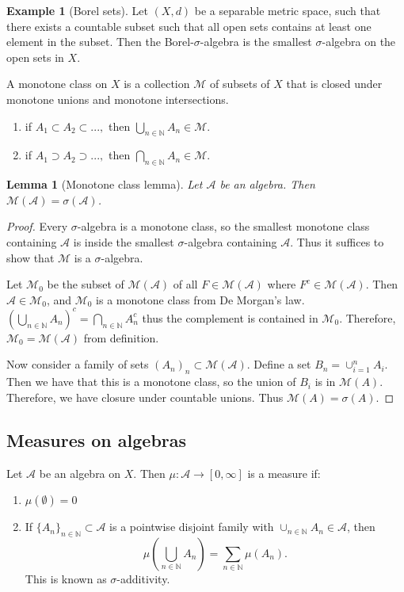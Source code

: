 \documentclass{article}
\newtheorem{lemma}[theorem]{Lemma}
\theoremstyle{definition}
\newtheorem{example}[theorem]{Example}
\numberwithin{theorem}{section}
\numberwithin{equation}{section}
\newcommand{\alg}{\mathcal{A}}
\newcommand{\mono}{\mathcal{M}}
\begin{document}
\begin{example}[Borel sets]
	Let $(X, d)$ be a separable metric space, such that there exists a countable subset such that all open sets contains at least one element in the subset. Then the Borel-$\sigma$-algebra is the smallest $\sigma$-algebra on the open sets in $X$.
\end{example}

A monotone class on $X$ is a collection $\mathcal{M}$ of subsets of $X$ that is closed under monotone unions and monotone intersections.
\begin{enumerate}
	\item if $A_1 \subset A_2 \subset ..., $ then $\bigcup_{n \in \mathbb{N}} A_n \in \mathcal{M}$.
	\item if $A_1 \supset A_2 \supset ..., $ then $\bigcap_{n \in \mathbb{N}} A_n \in \mathcal{M}$.
\end{enumerate}
\begin{lemma}[Monotone class lemma]
	Let $\alg$ be an algebra. Then $\mathcal{M}(\alg) = \sigma(\alg)$.
\end{lemma}

\begin{proof}
	Every $\sigma$-algebra is a monotone class, so the smallest monotone class containing $\alg$ is inside the smallest $\sigma$-algebra containing $\alg$. Thus it suffices to show that $\mono$ is a $\sigma$-algebra.
	
	Let $\mono_0$ be the subset of $\mono(\alg)$ of all $F \in \mono(\alg)$ where $F^c \in \mono(\alg)$. Then $\alg \in \mono_0$, and $\mono_0$ is a monotone class from De Morgan's law. $(\bigcup_{n \in \mathbb{N}} A_n)^c = \bigcap_{n \in \mathbb{N}} A_n^c$ thus the complement is contained in $\mono_0$. Therefore, $\mono_0 = \mono(\alg)$ from definition.
	\par
	Now consider a family of sets $(A_n)_n \subset \mathcal{M}(\alg)$. Define a set $B_n = \cup_{i = 1}^n A_i$. Then we have that this is a monotone class, so the union of $B_i$ is in $\mono(A)$. Therefore, we have closure under countable unions. 
	Thus $\mono(A) = \sigma(A)$.
\end{proof}

\subsection{Measures on algebras}
Let $\alg$ be an algebra on $X$. Then $\mu : \alg \rightarrow [0, \infty]$ is a measure if:

\begin{enumerate}
	\item $\mu(\emptyset) = 0$
	\item If $\lbrace A_n \rbrace_{n \in \mathbb{N}} \subset \alg$ is a pointwise disjoint family with $\cup_{n \in \mathbb{N}} A_n \in \alg$, then
	\begin{equation}
		\mu \left( \bigcup_{n \in \mathbb{N}} A_n\right) = \sum_{n \in \mathbb{N}} \mu(A_n).
	\end{equation}
	This is known as $\sigma$-additivity.
\end{enumerate}
\end{document}
